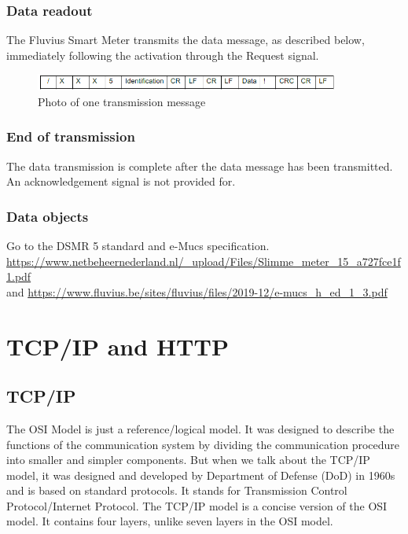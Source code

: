 \documentclass[a4paper,twoside, 12pt]{report}
\theoremstyle{break}
\begin{document}
\subsubsection{Data readout}
The Fluvius Smart Meter transmits the data message, as described below, immediately following the activation through the Request signal.

\begin{figure}[!ht]
  \centering
  \includegraphics[width=10cm]{CommunicationExample.png}
  \qquad
  \caption{Photo of one transmission message}
\end{figure}

\subsubsection{End of transmission}
The data transmission is complete after the data message has been transmitted. An acknowledgement signal is not provided for.

\subsubsection{Data objects}

Go to the DSMR 5 standard and e-Mucs specification.
\url{https://www.netbeheernederland.nl/_upload/Files/Slimme_meter_15_a727fce1f1.pdf}\\
and \url{https://www.fluvius.be/sites/fluvius/files/2019-12/e-mucs_h_ed_1_3.pdf}
\vfill
\eject

\section{TCP/IP and HTTP}
\subsection{TCP/IP}

The OSI Model is just a reference/logical model. It was designed to describe the functions of the communication system by dividing the communication procedure into smaller and simpler components. But when we talk about the TCP/IP model, it was designed and developed by Department of Defense (DoD) in 1960s and is based on standard protocols. It stands for Transmission Control Protocol/Internet Protocol. The TCP/IP model is a concise version of the OSI model. It contains four layers, unlike seven layers in the OSI model.
\end{document}
